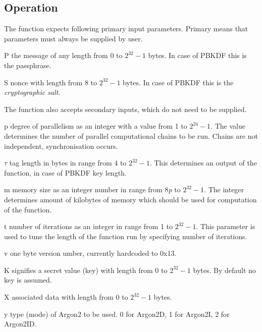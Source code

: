 \documentclass[nolof]{fithesis3}
\begin{document}
\subsection{Operation}
The function expects following primary input parameters. Primary means that parameters must always be supplied by user.

\begin{description}
\item{P} the message of any length from 0 to \(2^{32} - 1\) bytes. In case of PBKDF this is the passphrase.

\item{S} nonce with length from 8 to \(2^{32} - 1\) bytes. In case of PBKDF this is the \emph{cryptographic salt}.
\end{description}

The function also accepts secondary inputs, which do not need to be supplied.

\begin{description}
\item{p} degree of parallelism as an integer with a value from 1 to \(2^{24} - 1\). The value determines the number of parallel computational chains to be run. Chains are not independent, synchronisation occurs.

\item{\(\tau\)} tag length in bytes in range from 4 to \(2^{32} - 1\). This determines an output of the function, in case of PBKDF key length.

\item{m} memory size as an integer number in range from 8\emph{p} to \(2^{32} - 1\). The integer determines amount of kilobytes of memory which should be used for computation of the function.

\item{t} number of iterations as an integer in range from 1 to \(2^{32} - 1\). This parameter is used to tune the length of the function run by specifying number of iterations.

\item{v} one byte version umber, currently hardcoded to 0x13.

\item{K} signifies a secret value (key) with length from 0 to \(2^{32} - 1\) bytes. By default no key is assumed.

\item{X} associated data with length from 0 to \(2^{32} - 1\) bytes.

\item{y} type (mode) of Argon2 to be used. 0 for Argon2D, 1 for Argon2I, 2 for Argon2ID.
\end{description}
\end{document}
